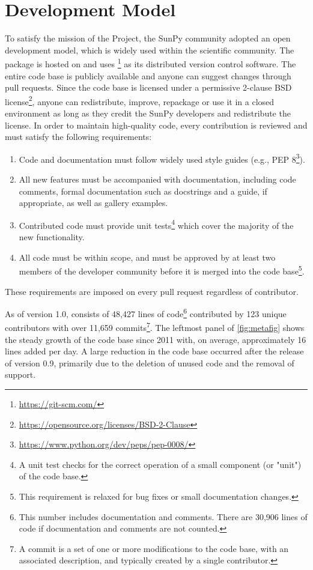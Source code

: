 \section{Development Model}
\label{sec:development}

To satisfy the mission of the Project, the SunPy community adopted an open development model, which is widely used within the scientific \python community.
The \sunpypkg package is hosted on \github and uses \footnote{\url{https://git-scm.com/}} as its distributed version control software.
The entire code base is publicly available and anyone can suggest changes through pull requests.
Since the code base is licensed under a permissive 2-clause BSD license\footnote{\url{https://opensource.org/licenses/BSD-2-Clause}}, anyone can redistribute, improve, repackage or use it in a closed environment as long as they credit the SunPy developers and redistribute the license.
In order to maintain high-quality code, every contribution is reviewed and must satisfy the following requirements:
\begin{enumerate}
    \item Code and documentation must follow widely used style guides (e.g., PEP 8\footnote{\url{https://www.python.org/dev/peps/pep-0008/}}).
    \item All new features must be accompanied with documentation, including code comments, formal documentation such as \python docstrings and a guide, if appropriate, as well as gallery examples.
    \item Contributed code must provide unit tests\footnote{A unit test checks for the correct operation of a small component (or "unit") of the code base.} which cover the majority of the new functionality.
    \item All code must be within scope, and must be approved by at least two members of the developer community before it is merged into the code base\footnote{This requirement is relaxed for bug fixes or small documentation changes.}.
\end{enumerate}
These requirements are imposed on every pull request regardless of contributor.

As of version 1.0, \sunpypkg consists of 48,427 lines of code\footnote{This number includes documentation and comments.
There are 30,906 lines of code if documentation and comments are not counted.} contributed by 123 unique contributors with over 11,659 commits\footnote{A commit is a set of one or more modifications to the code base, with an associated description, and typically created by a single contributor.}.
The leftmost panel of \autoref{fig:metafig} shows the steady growth of the code base since 2011 with, on average, approximately 16 lines added per day.
A large reduction in the code base occurred after the release of version 0.9, primarily due to the deletion of unused code and the removal of  support.

